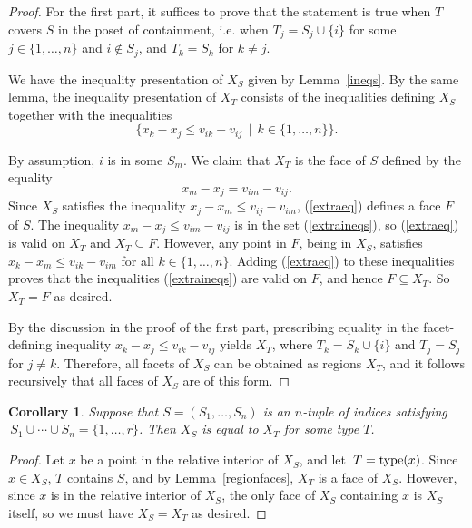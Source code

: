 \documentclass[11pt]{amsart}
\newtheorem{cor}[thm]{Corollary}
\begin{document}
\begin{proof}
For the first part, it suffices to prove that the statement is true when $T$ covers $S$ in the
poset of containment, i.e. when $T_j=S_j\cup \{i\}$ for 
some $j\in \{1,\ldots,n\}$ and $i\not\in
S_j$, and $T_k=S_k$ for $k\neq j$.

We have the inequality presentation of $X_S$ given by Lemma~\ref{ineqs}. By the same lemma, the
inequality presentation of $X_T$ consists of the 
inequalities defining $X_S$ together
with the inequalities 
\begin{equation}\label{extraineqs}
\{x_k-x_j \le v_{ik}-v_{ij}\,\mid\, k\in \{1,\ldots,n\}\}.
\end{equation}

By assumption, $i$ is in some $S_m$. We claim that $X_T$ is the face of $S$ defined by the equality
\begin{equation}\label{extraeq} x_m-x_j = v_{im}-v_{ij}. \end{equation}
Since $X_S$ satisfies the inequality $x_j-x_m\le v_{ij}-v_{im}$, (\ref{extraeq}) defines a face $F$ of 
$S$. The inequality $x_m-x_j\le v_{im}-v_{ij}$ is in the set (\ref{extraineqs}), so (\ref{extraeq}) is valid on 
$X_T$ and $X_T\subseteq F$. However, any point in $F$, being in $X_S$, satisfies $x_k-x_m\le v_{ik}-v_{im}$ for all 
$k\in \{1,\ldots,n\}$. Adding (\ref{extraeq}) to these inequalities proves that the inequalities 
(\ref{extraineqs}) are valid on $F$, and hence $F\subseteq X_T$. So $X_T=F$ as desired.

By the discussion
in the proof of the first part, prescribing equality in the facet-defining inequality $x_k-x_j\le v_{ik}-v_{ij}$ 
yields $X_T$, where $T_k = S_k\cup \{i\}$ and $T_j=S_j$ for $j\neq k$. Therefore, all facets of $X_S$ can be obtained 
as regions $X_T$, and it follows recursively that all faces of $X_S$ are of this form.
\end{proof}

\begin{cor}\label{alwaystype}
Suppose that $S=(S_1,\ldots,S_n)$ is an $n$-tuple of indices satisfying 
$\,S_1\cup\cdots\cup S_n=\{1,\ldots,r\}$.
Then $X_S$ is equal to $X_T$ for some type $T$.   
\end{cor}

\begin{proof}
Let $x$ be a point in the relative interior of $X_S$, 
and let $\,T = {\rm type}(x)$. Since $x\in
X_S$, $T$ contains $S$, and by Lemma~\ref{regionfaces}, 
$X_T$ is a face of $X_S$.
However, since $x$ is in the relative interior of $X_S$, 
the only face of $X_S$ containing $x$ is
$X_S$ itself, so we must have $X_S=X_T$ as desired.
\end{proof}
\end{document}
